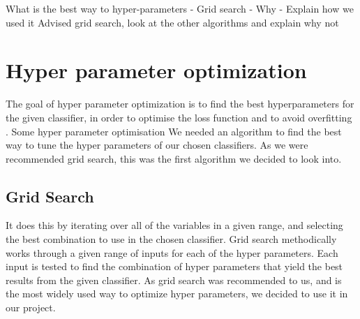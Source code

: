 \documentclass{article}
\begin{document}
What is the best way to hyper-parameters
-	Grid search 
-	Why
-	Explain how we used it 
Advised grid search, look at the other algorithms and explain why not 

\section{Hyper parameter optimization}

The goal of hyper parameter optimization is to find the best hyperparameters for the given classifier, in order to optimise the loss function and to avoid overfitting \cite{}. Some hyper parameter optimisation 
We needed an algorithm to find the best way to tune the hyper parameters of our chosen classifiers.  As we were recommended grid search, this was the first algorithm we decided to look into.  

\subsection{Grid Search}
It does this by iterating over all of the variables in a given range, and selecting the best combination to use in the chosen classifier. 
Grid search methodically works through a given range of inputs for each of the hyper parameters. Each input is tested to find the combination of hyper parameters that yield the best results from the given classifier. 
As grid search was recommended to us, and is the most widely used way to optimize hyper parameters, we decided to use it in our project.
\end{document}
